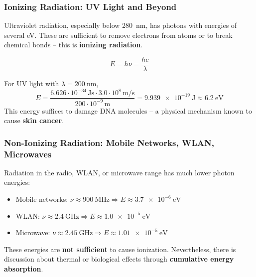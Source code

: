 \subsubsection{Ionizing Radiation: UV Light and Beyond}

Ultraviolet radiation, especially below \SI{280}{\nano\meter}, has photons with energies of several \si{\electronvolt}. These are sufficient to remove electrons from atoms or to break chemical bonds – this is \textbf{ionizing radiation}.

$$
E = h\nu = \frac{hc}{\lambda}
$$

For UV light with \(\lambda = \SI{200}{\nano\meter}\),
$$
E = \frac{6.626 \cdot 10^{-34}\,\si{\joule\second} \cdot 3.0 \cdot 10^8\,\si{\meter\per\second}}{200 \cdot 10^{-9}\,\si{\meter}}
= \SI{9.939e-19}{\joule} \approx \SI{6.2}{\electronvolt}
$$
This energy suffices to damage DNA molecules – a physical mechanism known to cause \textbf{skin cancer}.

\subsubsection{Non-Ionizing Radiation: Mobile Networks, WLAN, Microwaves}

Radiation in the radio, WLAN, or microwave range has much lower photon energies:
\begin{itemize}
	\item Mobile networks: $\nu \approx \SI{900}{\mega\hertz} \Rightarrow E \approx \SI{3.7e-6}{\electronvolt}$
	\item WLAN: $\nu \approx \SI{2.4}{\giga\hertz} \Rightarrow E \approx \SI{1.0e-5}{\electronvolt}$
	\item Microwave: $\nu \approx \SI{2.45}{\giga\hertz} \Rightarrow E \approx \SI{1.01e-5}{\electronvolt}$
\end{itemize}
These energies are \textbf{not sufficient} to cause ionization. Nevertheless, there is discussion about thermal or biological effects through \textbf{cumulative energy absorption}.

